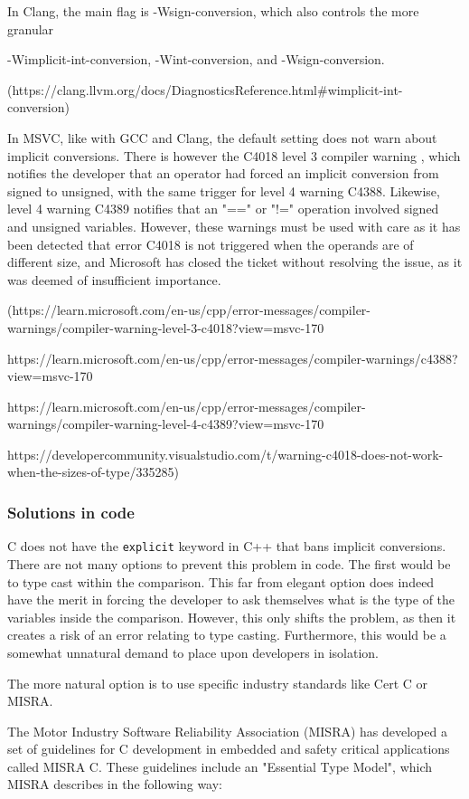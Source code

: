 \documentclass[11pt,letterpaper]{article}
\begin{document}
In Clang, the main flag is -Wsign-conversion, which also controls the more granular

-Wimplicit-int-conversion, -Wint-conversion, and -Wsign-conversion.

(https://clang.llvm.org/docs/DiagnosticsReference.html#wimplicit-int-conversion)

In MSVC, like with GCC and Clang, the default setting does not warn about implicit conversions. There is however the C4018 level 3 compiler warning , which notifies the developer that an operator had forced an implicit conversion from signed to unsigned, with the same trigger for level 4 warning C4388. Likewise, level 4 warning C4389 notifies that an "==" or "!=" operation involved signed and unsigned variables. However, these warnings must be used with care as it has been detected that error C4018 is not triggered when the operands are of different size, and Microsoft has closed the ticket without resolving the issue, as it was deemed of insufficient importance. 

(https://learn.microsoft.com/en-us/cpp/error-messages/compiler-warnings/compiler-warning-level-3-c4018?view=msvc-170

https://learn.microsoft.com/en-us/cpp/error-messages/compiler-warnings/c4388?view=msvc-170

https://learn.microsoft.com/en-us/cpp/error-messages/compiler-warnings/compiler-warning-level-4-c4389?view=msvc-170

https://developercommunity.visualstudio.com/t/warning-c4018-does-not-work-when-the-sizes-of-type/335285)

\subsubsection{Solutions in code}
C does not have the \texttt{explicit} keyword in C++ that bans implicit conversions. There are not many options to prevent this problem in code. The first would be to type cast within the comparison. This far from elegant option does indeed have the merit in  forcing the developer to ask themselves what is the type of the variables inside the comparison. However, this only shifts the problem, as then it creates a risk of an error relating to type casting. Furthermore, this would be a somewhat unnatural demand to place upon developers in isolation. 

The more natural option is to use specific industry standards like Cert C or MISRA.  

The Motor Industry Software Reliability Association (MISRA) has developed a set of guidelines for C development in embedded and safety critical applications called MISRA C. These guidelines include an "Essential Type Model", which MISRA describes in the following way:
\end{document}

